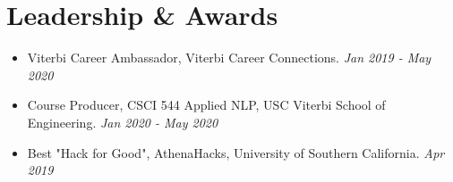 \documentclass[letterpaper,10pt]{article}
\newcommand{\activity}[2]{
    \item #1 \hfill{\emph{#2}}
}
\newcommand{\bulletsBegin}{
    \vspace{1pt}
    \begin{minipage}{17.6cm}
    \begin{itemize}[leftmargin=0.6cm]
    \setlength\itemsep{-0.1em}
}
\newcommand{\bulletsEnd}{
    \end{itemize}\vspace{0pt}
    \end{minipage}
}
\begin{document}
    
    \section{Leadership \& Awards}

    \bulletsBegin
        \activity{Viterbi Career Ambassador, Viterbi Career Connections.}{Jan 2019 - May 2020}
        \vspace{-3pt}
        \activity{Course Producer, CSCI 544 Applied NLP, USC Viterbi School of Engineering.}{Jan 2020 - May 2020}
        \vspace{-3pt}
        \activity{Best "Hack for Good", AthenaHacks, University of Southern California.}{Apr 2019}
        \vspace{-2pt}
    \bulletsEnd

\end{document}
